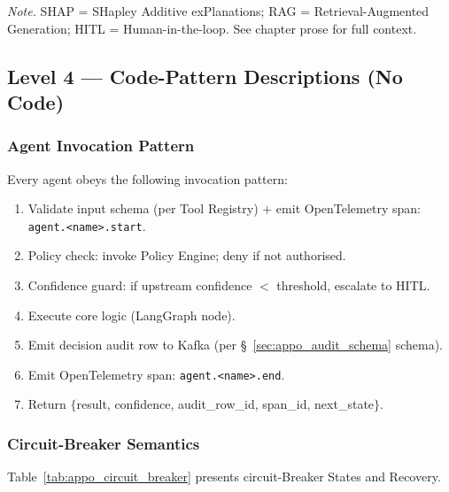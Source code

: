 \vspace{0.3em}\noindent\textit{Note.} SHAP = SHapley Additive exPlanations; RAG = Retrieval-Augmented Generation; HITL = Human-in-the-loop. See chapter prose for full context.

\subsection{Level 4 --- Code-Pattern Descriptions (No Code)}

\subsubsection{Agent Invocation Pattern}

\noindent Every agent obeys the following invocation pattern:

\begin{enumerate}[leftmargin=*, itemsep=2pt]
    \item Validate input schema (per Tool Registry) $+$ emit OpenTelemetry span: \texttt{agent.<name>.start}.
    \item Policy check: invoke Policy Engine; deny if not authorised.
    \item Confidence guard: if upstream confidence $<$ threshold, escalate to HITL.
    \item Execute core logic (LangGraph node).
    \item Emit decision audit row to Kafka (per \S~\ref{sec:appo_audit_schema} schema).
    \item Emit OpenTelemetry span: \texttt{agent.<name>.end}.
    \item Return $\{$result, confidence, audit\_row\_id, span\_id, next\_state$\}$.
\end{enumerate}

\subsubsection{Circuit-Breaker Semantics}
\noindent Table~\ref{tab:appo_circuit_breaker} presents circuit-Breaker States and Recovery.

